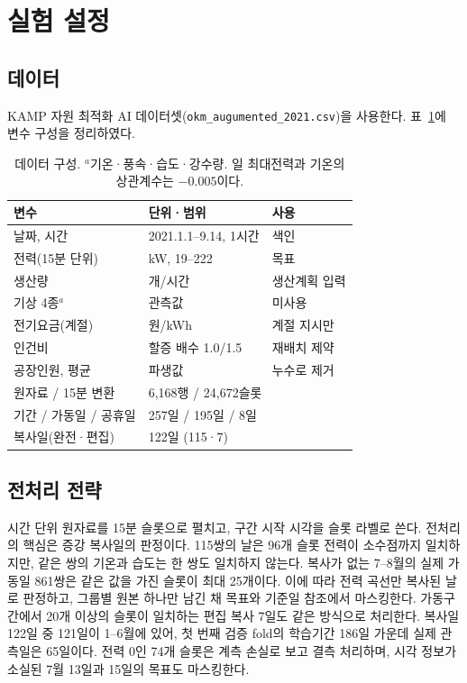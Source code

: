 \section{실험 설정}

\subsection{데이터}
KAMP 자원 최적화 AI 데이터셋(\texttt{okm\_augumented\_2021.csv})을 사용한다. 표~\ref{tab:data}에 변수 구성을 정리하였다.

\begin{table}[t]
\centering
\footnotesize
\setlength{\tabcolsep}{3pt}
\begin{tabular}{@{}lll@{}}
\toprule
변수 & 단위·범위 & 사용 \\
\midrule
날짜, 시간 & 2021.1.1–9.14, 1시간 & 색인 \\
전력(15분 단위) & kW, 19–222 & 목표 \\
생산량 & 개/시간 & 생산계획 입력 \\
기상 4종$^{a}$ & 관측값 & 미사용 \\
전기요금(계절) & 원/kWh & 계절 지시만 \\
인건비 & 할증 배수 1.0/1.5 & 재배치 제약 \\
공장인원, 평균 & 파생값 & 누수로 제거 \\
\midrule
원자료 / 15분 변환 & \multicolumn{2}{l}{6,168행 / 24,672슬롯} \\
기간 / 가동일 / 공휴일 & \multicolumn{2}{l}{257일 / 195일 / 8일} \\
복사일(완전·편집) & \multicolumn{2}{l}{122일 (115·7)} \\
\bottomrule
\end{tabular}
\caption{데이터 구성. $^{a}$기온·풍속·습도·강수량. 일 최대전력과 기온의 상관계수는 $-0.005$이다.}
\label{tab:data}
\end{table}

\subsection{전처리 전략}
시간 단위 원자료를 15분 슬롯으로 펼치고, 구간 시작 시각을 슬롯 라벨로 쓴다. 전처리의 핵심은 증강 복사일의 판정이다. 115쌍의 날은 96개 슬롯 전력이 소수점까지 일치하지만, 같은 쌍의 기온과 습도는 한 쌍도 일치하지 않는다. 복사가 없는 7–8월의 실제 가동일 861쌍은 같은 값을 가진 슬롯이 최대 25개이다. 이에 따라 전력 곡선만 복사된 날로 판정하고, 그룹별 원본 하나만 남긴 채 목표와 기준일 참조에서 마스킹한다. 가동구간에서 20개 이상의 슬롯이 일치하는 편집 복사 7일도 같은 방식으로 처리한다. 복사일 122일 중 121일이 1–6월에 있어, 첫 번째 검증 fold의 학습기간 186일 가운데 실제 관측일은 65일이다. 전력 0인 74개 슬롯은 계측 손실로 보고 결측 처리하며, 시각 정보가 소실된 7월 13일과 15일의 목표도 마스킹한다.

